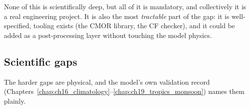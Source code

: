 None of this is scientifically deep, but all of it is mandatory, and collectively
it is a real engineering project. It is also the most \emph{tractable} part of the
gap: it is well-specified, tooling exists (the CMOR library, the CF checker), and it
could be added as a post-processing layer without touching the model physics.

\subsection{Scientific gaps}\label{sec:c20_sci}

The harder gaps are physical, and the model's own validation record
(Chapters~\ref{chap:ch16_climatology}--\ref{chap:ch19_tropics_monsoon}) names them
plainly.

